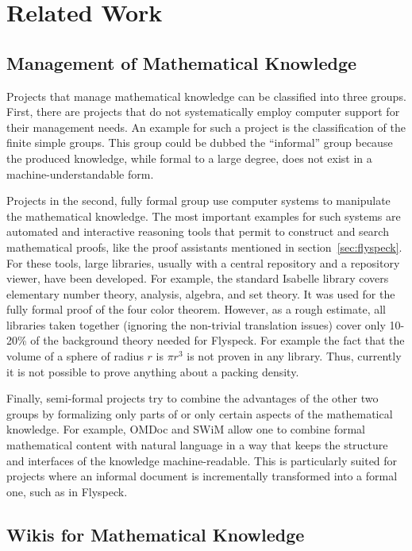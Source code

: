 \section{Related Work}
\label{sec:related}


\subsection{Management of Mathematical Knowledge}
\label{sec:mkm}

Projects that manage mathematical knowledge can be classified into
three groups.  First, there are projects that do not systematically
employ computer support for their management needs.  An example for
such a project is the classification of the finite simple
groups\cite{Gorenstein-Lyons-Salomon:1994}.  This group could be
dubbed the ``informal'' group because the produced knowledge, while
formal to a large degree, does not exist in a machine-understandable
form.

Projects in the second, fully formal group use computer systems to manipulate
the mathematical knowledge.  The most important examples for such systems are
automated and interactive reasoning tools that permit to construct and search
mathematical proofs, like the proof assistants mentioned in
section~\ref{sec:flyspeck}.  For these tools, large libraries, usually with a
central repository and a repository viewer, have been developed.  For example,
the standard Isabelle library covers elementary number theory, analysis,
algebra, and set theory.  It was used for the fully formal proof of the four
color theorem\cite{Gonthier:2005:FourColor}. However, as a rough estimate, all
libraries taken together (ignoring the non-trivial translation issues) cover
only 10-20\% of the background theory needed for Flyspeck. For example the fact
that the volume of a sphere of radius $r$ is $\pi r^3$ is not proven in any
library.  Thus, currently it is not possible to prove anything about a packing
density.

Finally, semi-formal projects try to combine the advantages of the
other two groups by formalizing only parts of or only certain aspects
of the mathematical knowledge.  For example, OMDoc and SWiM allow one to
combine formal mathematical content with natural language in a way
that keeps the structure and interfaces of the knowledge
machine-readable.  This is particularly suited for projects where an
informal document is incrementally transformed into a formal one, such
as in Flyspeck.

\subsection{Wikis for Mathematical Knowledge}
\label{sec:math-wiki}

